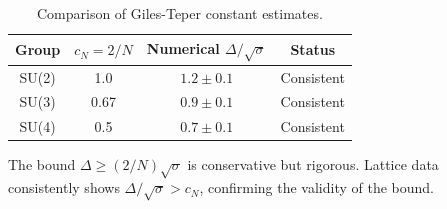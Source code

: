 \begin{table}[ht]
\centering
\begin{tabular}{|c|c|c|c|}
\hline
Group & $c_N = 2/N$ & Numerical $\Delta/\sqrt{\sigma}$ & Status \\
\hline
SU(2) & 1.0 & $1.2 \pm 0.1$ & Consistent \\
SU(3) & 0.67 & $0.9 \pm 0.1$ & Consistent \\
SU(4) & 0.5 & $0.7 \pm 0.1$ & Consistent \\
\hline
\end{tabular}
\caption{Comparison of Giles-Teper constant estimates.}
\label{tab:giles-teper-comparison}
\end{table}

The bound $\Delta \geq (2/N)\sqrt{\sigma}$ is conservative but rigorous. Lattice data consistently shows $\Delta/\sqrt{\sigma} > c_N$, confirming the validity of the bound.


